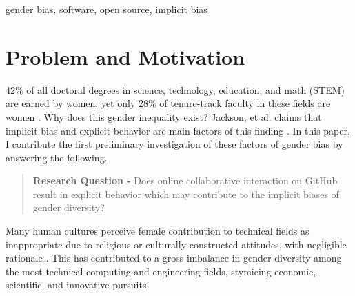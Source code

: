 \documentclass{sigplanconf}
\begin{document}
\keywords
gender bias, software, open source, implicit bias


\section{Problem and Motivation}

42\% of all doctoral degrees in science, technology, education, and
math (STEM) are earned by women, yet only 28\% of tenure-track faculty in these
fields are women \citep{womenengineering}. Why does this gender inequality exist?
Jackson, et al. claims that implicit bias and explicit behavior are main
factors of this finding \cite{implicitbias}. In this paper, I
contribute the first preliminary investigation of these factors of gender bias
by answering the following.

\begin{quote}
  \textbf{Research Question -} Does online collaborative interaction on GitHub result in
  explicit behavior which may contribute to the implicit biases of gender diversity?
\end{quote}

Many human cultures perceive female contribution to technical
fields as inappropriate due to religious or culturally constructed attitudes, with
negligible rationale \citep{elamin2010saudiwomen}. This has contributed to a gross imbalance in gender diversity among
the most technical computing and engineering fields, stymieing economic,
scientific, and innovative pursuits \citep{genderscience}
\end{document}
